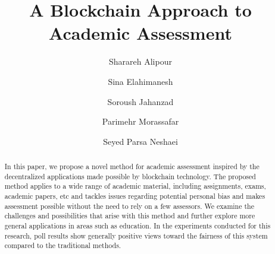 \documentclass[manuscript,review,anonymous]{acmart}%
\begin{document}
\title{A Blockchain Approach to Academic Assessment}


\author{Sharareh Alipour}
\authornotemark[1]

\author{Sina Elahimanesh}

\author{Soroush Jahanzad}

\author{Parimehr Morassafar}

\author{Seyed Parsa Neshaei}



\renewcommand{\shortauthors}{Alipour and et al.}

\begin{abstract}
In this paper, we propose a novel method for academic assessment inspired by the decentralized applications made possible by blockchain technology.
  The proposed method applies to a wide range of academic material, including assignments, exams, academic papers, etc  
  and tackles issues regarding potential personal bias and makes assessment possible without the need to rely on a few assessors.
  We examine the challenges and possibilities that arise with this method and further explore more general applications in areas such as education.
  In the experiments conducted for this research, poll results show generally positive views toward the fairness of this system compared to the traditional methods.

\end{abstract}
\end{document}
